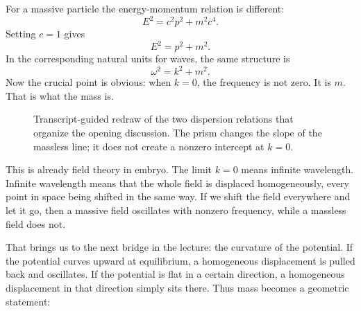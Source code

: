 For a massive particle the energy-momentum relation is different:
\begin{equation}
E^2 = c^2p^2 + m^2c^4.
\end{equation}
Setting \(c=1\) gives
\begin{equation}
E^2 = p^2 + m^2.
\end{equation}
In the corresponding natural units for waves, the same structure is
\begin{equation}
\omega^2 = k^2 + m^2.
\end{equation}
Now the crucial point is obvious: when \(k=0\), the frequency is not zero. It is \(m\). That is what the mass is.

\begin{figure}[t]
\centering
{}
\hspace{1.2cm}
\caption{Transcript-guided redraw of the two dispersion relations that organize the opening discussion. The prism changes the slope of the massless line; it does not create a nonzero intercept at \(k=0\).}
\end{figure}

This is already field theory in embryo. The limit \(k=0\) means infinite wavelength. Infinite wavelength means that the whole field is displaced homogeneously, every point in space being shifted in the same way. If we shift the field everywhere and let it go, then a massive field oscillates with nonzero frequency, while a massless field does not.

That brings us to the next bridge in the lecture: the curvature of the potential. If the potential curves upward at equilibrium, a homogeneous displacement is pulled back and oscillates. If the potential is flat in a certain direction, a homogeneous displacement in that direction simply sits there. Thus mass becomes a geometric statement:

